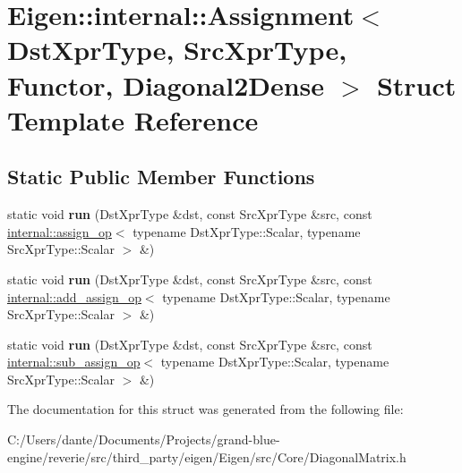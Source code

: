 \hypertarget{struct_eigen_1_1internal_1_1_assignment_3_01_dst_xpr_type_00_01_src_xpr_type_00_01_functor_00_01_diagonal2_dense_01_4}{}\section{Eigen\+::internal\+::Assignment$<$ Dst\+Xpr\+Type, Src\+Xpr\+Type, Functor, Diagonal2\+Dense $>$ Struct Template Reference}
\label{struct_eigen_1_1internal_1_1_assignment_3_01_dst_xpr_type_00_01_src_xpr_type_00_01_functor_00_01_diagonal2_dense_01_4}
\subsection*{Static Public Member Functions}
\begin{DoxyCompactItemize}
\item 
\mbox{\label{struct_eigen_1_1internal_1_1_assignment_3_01_dst_xpr_type_00_01_src_xpr_type_00_01_functor_00_01_diagonal2_dense_01_4_ad33964548f8f2981e5d35e2d2e8fffe8}} 
static void {\bfseries run} (Dst\+Xpr\+Type \&dst, const Src\+Xpr\+Type \&src, const \mbox{\hyperlink{struct_eigen_1_1internal_1_1assign__op}{internal\+::assign\+\_\+op}}$<$ typename Dst\+Xpr\+Type\+::\+Scalar, typename Src\+Xpr\+Type\+::\+Scalar $>$ \&)
\item 
\mbox{\label{struct_eigen_1_1internal_1_1_assignment_3_01_dst_xpr_type_00_01_src_xpr_type_00_01_functor_00_01_diagonal2_dense_01_4_a4267da91867006719a3767e13c44098c}} 
static void {\bfseries run} (Dst\+Xpr\+Type \&dst, const Src\+Xpr\+Type \&src, const \mbox{\hyperlink{struct_eigen_1_1internal_1_1add__assign__op}{internal\+::add\+\_\+assign\+\_\+op}}$<$ typename Dst\+Xpr\+Type\+::\+Scalar, typename Src\+Xpr\+Type\+::\+Scalar $>$ \&)
\item 
\mbox{\label{struct_eigen_1_1internal_1_1_assignment_3_01_dst_xpr_type_00_01_src_xpr_type_00_01_functor_00_01_diagonal2_dense_01_4_a08f8787f00a2ea39eea1e0d2d64cb2a4}} 
static void {\bfseries run} (Dst\+Xpr\+Type \&dst, const Src\+Xpr\+Type \&src, const \mbox{\hyperlink{struct_eigen_1_1internal_1_1sub__assign__op}{internal\+::sub\+\_\+assign\+\_\+op}}$<$ typename Dst\+Xpr\+Type\+::\+Scalar, typename Src\+Xpr\+Type\+::\+Scalar $>$ \&)
\end{DoxyCompactItemize}


The documentation for this struct was generated from the following file\+:\begin{DoxyCompactItemize}
\item 
C\+:/\+Users/dante/\+Documents/\+Projects/grand-\/blue-\/engine/reverie/src/third\+\_\+party/eigen/\+Eigen/src/\+Core/Diagonal\+Matrix.\+h\end{DoxyCompactItemize}
